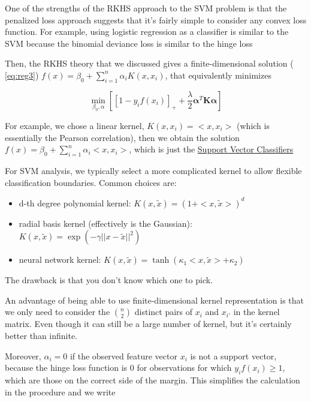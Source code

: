\documentclass[
]{book}
\begin{document}
One of the strengths of the RKHS approach to the SVM problem is that the penalized loss approach suggests that it's fairly simple to consider any convex loss function. For example, using logistic regression as a classifier is similar to the SVM because the binomial deviance loss is similar to the hinge loss

Then, the RKHS theory that we discussed gives a finite-dimensional solution ( \eqref{eq:reg3}) \(f(x) = \beta_0 + \sum_{i=1}^n \alpha_i K(x, x_i)\), that equivalently minimizes

\begin{equation}
\label{eq:reg6}
\underset{\beta_0, \alpha}{\operatorname{min}} [ [1 - y_i f(x_i)]_+ + \frac{\lambda}{2} \mathbf{\alpha}^T \mathbf{K \alpha}] 
\end{equation}

For example, we chose a linear kernel, \(K(x, x_i) = <x, x_i>\) (which is essentially the Pearson correlation), then we obtain the solution \(f(x) = \beta_0 + \sum_{i=1}^n \alpha_i <x, x_i>\), which is just the \protect\hyperlink{support-vector-classifiers}{Support Vector Classifiers}

For SVM analysis, we typically select a more complicated kernel to allow flexible classification boundaries. Common choices are:

\begin{itemize}
\item
  d-th degree polynomial kernel: \(K(x, \tilde{x}) = (1 + <x, \tilde{x}>)^d\)
\item
  radial basis kernel (effectively is the Gaussian): \(K(x, \tilde{x}) = \exp(-\gamma ||x - \tilde{x}||^2 )\)
\item
  neural network kernel: \(K(x, \tilde{x}) = \tanh (\kappa_1 <x, \tilde{x}>+ \kappa_2)\)
\end{itemize}

The drawback is that you don't know which one to pick.

An advantage of being able to use finite-dimensional kernel representation is that we only need to consider the \(\binom{n}{2}\) distinct pairs of \(x_i\) and \(x_{i'}\) in the kernel matrix. Even though it can still be a large number of kernel, but it's certainly better than infinite.

Moreover, \(\alpha_i = 0\) if the observed feature vector \(x_i\) is not a support vector, because the hinge loss function is 0 for observations for which \(y_i f(x_i) \ge 1\), which are those on the correct side of the margin. This simplifies the calculation in the procedure and we write
\end{document}
